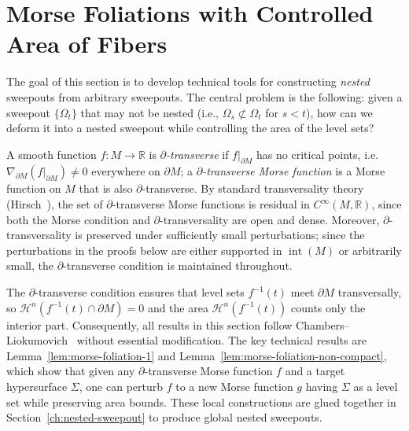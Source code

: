 \section{Morse Foliations with Controlled Area of Fibers}\label{ch:morse-foliation}

The goal of this section is to develop technical tools for constructing \emph{nested} sweepouts from arbitrary sweepouts. The central problem is the following: given a sweepout $\{\Omega_t\}$ that may not be nested (i.e., $\Omega_s \not\subset \Omega_t$ for $s < t$), how can we deform it into a nested sweepout while controlling the area of the level sets?

A smooth function $f\colon M \to \mathbb{R}$ is \emph{$\partial$-transverse}\label{def:boundary-transverse} if $f|_{\partial M}$ has no critical points, i.e.\ $\nabla_{\partial M}(f|_{\partial M}) \neq 0$ everywhere on $\partial M$; a \emph{$\partial$-transverse Morse function} is a Morse function on $M$ that is also $\partial$-transverse. By standard transversality theory (Hirsch~\cite[Chapter~4]{Hir76}), the set of $\partial$-transverse Morse functions is residual in $C^\infty(M, \mathbb{R})$, since both the Morse condition and $\partial$-transversality are open and dense. Moreover, $\partial$-transversality is preserved under sufficiently small perturbations; since the perturbations in the proofs below are either supported in $\operatorname{int}(M)$ or arbitrarily small, the $\partial$-transverse condition is maintained throughout.

The $\partial$-transverse condition ensures that level sets $f^{-1}(t)$ meet $\partial M$ transversally, so $\mathcal{H}^n(f^{-1}(t) \cap \partial M) = 0$ and the area $\mathcal{H}^n(f^{-1}(t))$ counts only the interior part. Consequently, all results in this section follow Chambers--Liokumovich~\cite[\S3--4]{CL20} without essential modification. The key technical results are Lemma~\ref{lem:morse-foliation-1} and Lemma~\ref{lem:morse-foliation-non-compact}, which show that given any $\partial$-transverse Morse function $f$ and a target hypersurface $\Sigma$, one can perturb $f$ to a new Morse function $g$ having $\Sigma$ as a level set while preserving area bounds. These local constructions are glued together in Section~\ref{ch:nested-sweepout} to produce global nested sweepouts.

